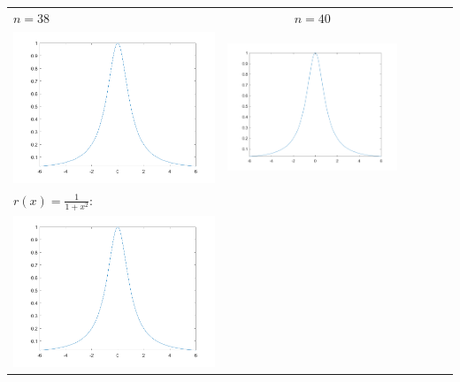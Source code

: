 \begin{tabular}{l*{5}{c}}
\hspace{3.5cm}\(n=38\) &  \(n=40\) \\
\includegraphics[scale=0.5]{cap4/4_7/38.png} &  \includegraphics[scale=0.5]{cap4/4_7/40.png} \\
\hspace{2.6cm}\(r(x) = \frac{1}{1+x^2}\): &  \\
\includegraphics[scale=0.5]{cap4/4_7/runge.png} & \\
\end{tabular}
